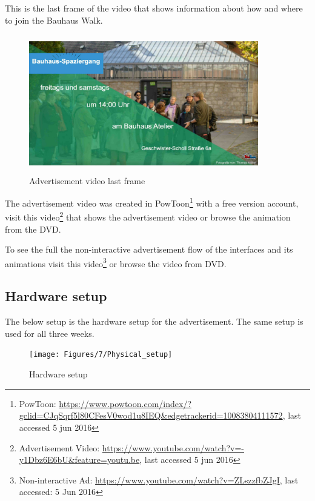 \begin{enumerate}
This is the last frame of the video that shows information about how and where to join the Bauhaus Walk.

\begin{figure}[H]
    \centering
    \includegraphics[width=100mm,height=60mm]{Figures/7/ad_last}
    \caption{Advertisement video last frame}%
    \label{fig:adthirdpage2}%
\end{figure}

The advertisement video was created in PowToon\footnote{PowToon: \url{https://www.powtoon.com/index/?gclid=CJqSqrf5l80CFesV0wod1u8IEQ&edgetrackerid=10083804111572}, last accessed 5 jun 2016} with a free version account, visit this video\footnote{Advertisement Video:  \url{https://www.youtube.com/watch?v=-y1Dbz6E6bU&feature=youtu.be}, last accessed 5 jun 2016} that shows the advertisement video or browse the animation from the DVD. 

To see the full the non-interactive advertisement flow of the interfaces and its animations visit this video\footnote{Non-interactive Ad: \url{https://www.youtube.com/watch?v=ZLszzfbZJgI}, last accessed: 5 Jun 2016} or browse the video from DVD.


\end{enumerate}

\iffalse
\subsection{Hardware setup}
The below setup is the hardware setup for the advertisement. The same setup is used for all three weeks.

\begin{figure}[H]
    \centering
    \texttt{[image: Figures/7/Physical\_setup]}
    \caption{Hardware setup}%
    \label{fig:hardwaresetup}%
\end{figure}



